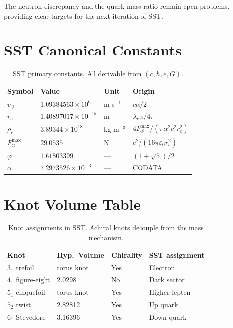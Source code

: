 \documentclass[11pt,a4paper]{article}
\begin{document}
The neutron discrepancy and the quark mass ratio remain open problems, providing
clear targets for the next iteration of SST.

\appendix
\section{SST Canonical Constants}

\begin{table}[H]
\centering
\begin{tabular}{llll}
\toprule
\textbf{Symbol} & \textbf{Value} & \textbf{Unit} & \textbf{Origin} \\
\midrule
$v_{\circlearrowleft}$ & $1.09384563\times10^6$ & m s$^{-1}$ & $c\alpha/2$ \\
$r_c$           & $1.40897017\times10^{-15}$ & m & $\lambda_c\alpha/4\pi$ \\
$\rho_c$        & $3.89344\times10^{18}$ & kg m$^{-3}$ & $4F_{\circlearrowleft}^{\max}/(\pi\alpha^2 c^2 r_c^2)$ \\
$F_{\circlearrowleft}^{\max}$ & $29.0535$ & N & $e^2/(16\pi\varepsilon_0 r_c^2)$ \\
$\varphi$       & $1.61803399$ & --- & $(1+\sqrt{5})/2$ \\
$\alpha$        & $7.2973526\times10^{-3}$ & --- & CODATA \\
\bottomrule
\end{tabular}
\caption{SST primary constants. All derivable from $(c,\hbar,e,G)$.}
\end{table}

\appendix
\section{Knot Volume Table}

\begin{table}[H]
\centering
\begin{tabular}{llll}
\toprule
\textbf{Knot} & \textbf{Hyp.\ Volume} & \textbf{Chirality} & \textbf{SST assignment} \\
\midrule
$3_1$ trefoil      & torus knot  & Yes & Electron \\
$4_1$ figure-eight & 2.0298      & No  & Dark sector \\
$5_1$ cinquefoil   & torus knot  & Yes & Higher lepton \\
$5_2$ twist        & 2.82812     & Yes & Up quark \\
$6_1$ Stevedore    & 3.16396     & Yes & Down quark \\
\bottomrule
\end{tabular}
\caption{Knot assignments in SST. Achiral knots decouple from the mass mechanism.}
\end{table}
\end{document}
